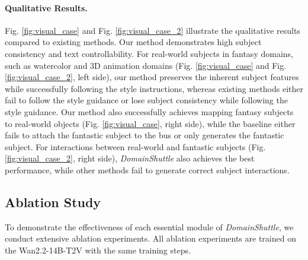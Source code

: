 \documentclass{llmxive}
\begin{document}
\paragraph{\textbf{Qualitative Results.}} Fig. \ref{fig:visual_case} and Fig. \ref{fig:visual_case_2} illustrate the qualitative results compared to existing methods. Our method demonstrates high subject consistency and text controllability. For real-world subjects in fantasy domains, such as watercolor and 3D animation domains (Fig. \ref{fig:visual_case} and Fig. \ref{fig:visual_case_2}, left side), our method preserves the inherent subject features while successfully following the style instructions, whereas existing methods either fail to follow the style guidance or lose subject consistency while following the style guidance. Our method also successfully achieves mapping fantasy subjects to real-world objects (Fig. \ref{fig:visual_case}, right side), while the baseline either fails to attach the fantastic subject to the bus or only generates the fantastic subject. For interactions between real-world and fantastic subjects (Fig. \ref{fig:visual_case_2}, right side), \textit{DomainShuttle} also achieves the best performance, while other methods fail to generate correct subject interactions. %



\subsection{Ablation Study}
To demonstrate the effectiveness of each essential module of \textit{DomainShuttle}, we conduct extensive ablation experiments. All ablation experiments are trained on the Wan2.2-14B-T2V with the same training steps.
\end{document}
